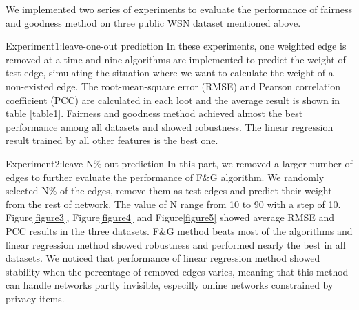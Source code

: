 
We implemented two series of experiments to evaluate the 
performance of fairness and goodness method on three public 
WSN dataset mentioned above. 

Experiment1:leave-one-out prediction
In these experiments, one weighted edge is removed at a time 
and nine algorithms are implemented to predict the weight of 
test edge, simulating the situation where we want to calculate 
the weight of a non-existed edge. The root-mean-square error 
(RMSE) and Pearson correlation coefficient (PCC) are calculated 
in each loot and the average result is shown in table \ref{table1}. 
Fairness and goodness method achieved almost the best 
performance among all datasets and showed robustness. 
The linear regression result trained by all other features 
is the best one. 

Experiment2:leave-N\%-out prediction
In this part, we removed a larger number of edges to further 
evaluate the performance of F\&G algorithm. We randomly selected 
N\% of the edges, remove them as test edges and predict their 
weight from the rest of network. The value of N range from 10 
to 90 with a step of 10. Figure\ref{figure3}, Figure\ref{figure4} and 
Figure\ref{figure5} showed average RMSE and PCC results in 
the three datasets. F\&G method beats most of the algorithms 
and linear regression method showed robustness and performed 
nearly the best in all datasets. We noticed that performance of
 linear regression method showed stability when the percentage 
 of removed edges varies, meaning that this method can handle 
 networks partly invisible, especilly online networks 
 constrained by privacy items. 


